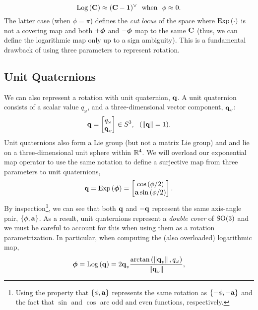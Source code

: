 \begin{equation}
	\mathrm{Log}\left({\boldsymbol{\mathbf{C}}}\right) \approx (\boldsymbol{\mathbf{C}} - \boldsymbol{\mathbf{1}})^\vee ~~ \textrm{when} ~~ \phi \approx 0. 
\end{equation}
The latter case (when $\phi = \pi$) defines the \textit{cut locus} of the space where $\mathrm{Exp}\left({\cdot}\right)$ is not a covering map and both $+\boldsymbol{\mathbf{\phi}}$ and $-\boldsymbol{\mathbf{\phi}}$ map to the same $\boldsymbol{\mathbf{C}}$ (thus, we can define the logarithmic map only up to a sign ambiguity). This is a fundamental drawback of using three parameters to represent rotation.

\subsection{Unit Quaternions}

We can also represent a rotation with unit quaternion, $\boldsymbol{\mathbf{q}}$. A unit quaternion consists of a scalar value $q_\omega$, and a three-dimensional vector component, $\boldsymbol{\mathbf{q}}_v$:
\begin{equation}
	\boldsymbol{\mathbf{q}} = \begin{bmatrix} q_\omega \\ \boldsymbol{\mathbf{q}}_v \end{bmatrix} \in S^3, ~~ (\left\Vert\boldsymbol{\mathbf{q}}\right\Vert = 1).
\end{equation}
Unit quaternions also form a Lie group \citep{Sola2018-kg} (but not a matrix Lie group) and and lie on a three-dimensional unit sphere within $\mathbb{R}{}^4$. We will overload our exponential map operator to use the same notation to define a surjective map from three parameters to unit quaternions,
\begin{equation}
\boldsymbol{\mathbf{q}} = \mathrm{Exp}\left({\boldsymbol{\mathbf{\phi}}}\right) = \begin{bmatrix} \cos{(\phi/2)} \\ \boldsymbol{\mathbf{a}} \sin{(\phi/2)} \end{bmatrix}.	
\end{equation}
By inspection\footnote{Using the property that $\{\phi, \boldsymbol{\mathbf{a}}\}$ represents the same rotation as $\{-\phi, -\boldsymbol{\mathbf{a}}\}$ and the fact that $\sin$ and $\cos$ are odd and even functions, respectively.}, we can see that both $\boldsymbol{\mathbf{q}}$ and $-\boldsymbol{\mathbf{q}}$ represent the same axis-angle pair, $\{\phi, \boldsymbol{\mathbf{a}}\}$. As a result, unit quaternions represent a \textit{double cover} of $\mathrm{SO}(3)$ and we must be careful to account for this when using them as a rotation parametrization.
In particular, when computing the (also overloaded) logarithmic map,
\begin{align}
\label{eq:math_quat_log}
	\boldsymbol{\mathbf{\phi}} =  \mathrm{Log}\left({\boldsymbol{\mathbf{q}}}\right) = 2 \boldsymbol{\mathbf{q}}_v \frac{\arctan{(\left\Vert \boldsymbol{\mathbf{q}} _v\right\Vert ,  q_\omega})}{\left\Vert\boldsymbol{\mathbf{q}}_v\right\Vert},
\end{align}

